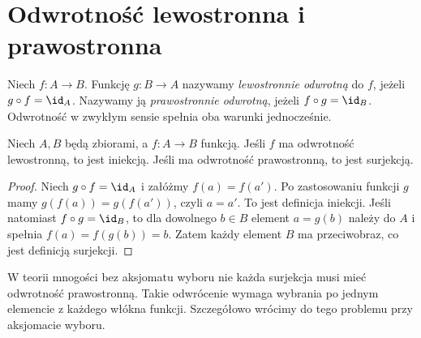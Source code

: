 \section{Odwrotność lewostronna i prawostronna}
\begin{definicja}
Niech $f:A\to B$. Funkcję $g:B\to A$ nazywamy
\emph{lewostronnie odwrotną} do $f$, jeżeli
$g\circ f=\id_A$. Nazywamy ją \emph{prawostronnie odwrotną},
jeżeli $f\circ g=\id_B$. Odwrotność w zwykłym sensie
spełnia oba warunki jednocześnie.
\end{definicja}
\begin{twierdzenie}
Niech $A,B$ będą zbiorami, a $f:A\to B$ funkcją.
Jeśli $f$ ma odwrotność lewostronną, to jest iniekcją.
Jeśli ma odwrotność prawostronną, to jest surjekcją.
\end{twierdzenie}
\begin{proof}
Niech $g\circ f=\id_A$ i załóżmy $f(a)=f(a')$.
Po zastosowaniu funkcji $g$ mamy
$g(f(a))=g(f(a'))$, czyli $a=a'$. To jest definicja iniekcji.
Jeśli natomiast $f\circ g=\id_B$, to dla dowolnego $b\in B$
element $a=g(b)$ należy do $A$ i spełnia
$f(a)=f(g(b))=b$. Zatem każdy element $B$ ma przeciwobraz,
co jest definicją surjekcji.
\end{proof}
\begin{uwaga}
W teorii mnogości bez aksjomatu wyboru nie każda surjekcja
musi mieć odwrotność prawostronną. Takie odwrócenie wymaga
wybrania po jednym elemencie z każdego włókna funkcji.
Szczegółowo wrócimy do tego problemu przy aksjomacie wyboru.
\end{uwaga}


